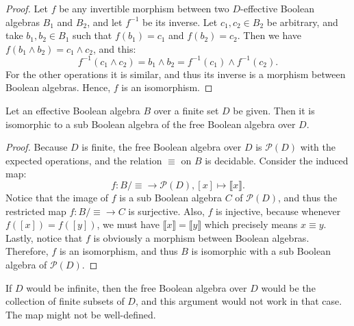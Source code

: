 \begin{proof}
Let $f$ be any invertible morphism between two $D$-effective Boolean algebras $B_1$ and $B_2$, and let $f^{-1}$ be its inverse. Let $c_1, c_2 \in B_2$ be arbitrary, and take $b_1, b_2 \in B_1$ such that $f(b_1) = c_1$ and $f(b_2) = c_2$. Then we have $f(b_1 \wedge b_2) = c_1 \wedge c_2$, and this:
\[f^{-1}(c_1 \wedge c_2) = b_1 \wedge b_2 = f^{-1}(c_1) \wedge f^{-1}(c_2).\]
For the other operations it is similar, and thus its inverse is a morphism between Boolean algebras. Hence, $f$ is an isomorphism. 
\end{proof}

\begin{proposition}
Let an effective Boolean algebra $B$ over a finite set $D$ be given. Then it is isomorphic to a sub Boolean algebra of the free Boolean algebra over $D$.
\end{proposition}

\begin{proof}
Because $D$ is finite, the free Boolean algebra over $D$ is $\mathcal{P}(D)$ with the expected operations, and the relation $\equiv$ on $B$ is decidable. Consider the induced map:
\[f : B/{\equiv} \rightarrow \mathcal{P}(D), [x] \mapsto \llbracket x \rrbracket.\]
Notice that the image of $f$ is a sub Boolean algebra $C$ of $\mathcal{P}(D)$, and thus the restricted map $f : B/{\equiv} \rightarrow C$ is surjective. Also, $f$ is injective, because whenever $f([x]) = f([y])$, we must have $\llbracket x \rrbracket = \llbracket y \rrbracket$ which precisely means $x \equiv y$. Lastly, notice that $f$ is obviously a morphism between Boolean algebras. Therefore, $f$ is an isomorphism, and thus $B$ is isomorphic with a sub Boolean algebra of $\mathcal{P}(D)$.
\end{proof}

If $D$ would be infinite, then the free Boolean algebra over $D$ would be the collection of finite subsets of $D$, and this argument would not work in that case. The map might not be well-defined.